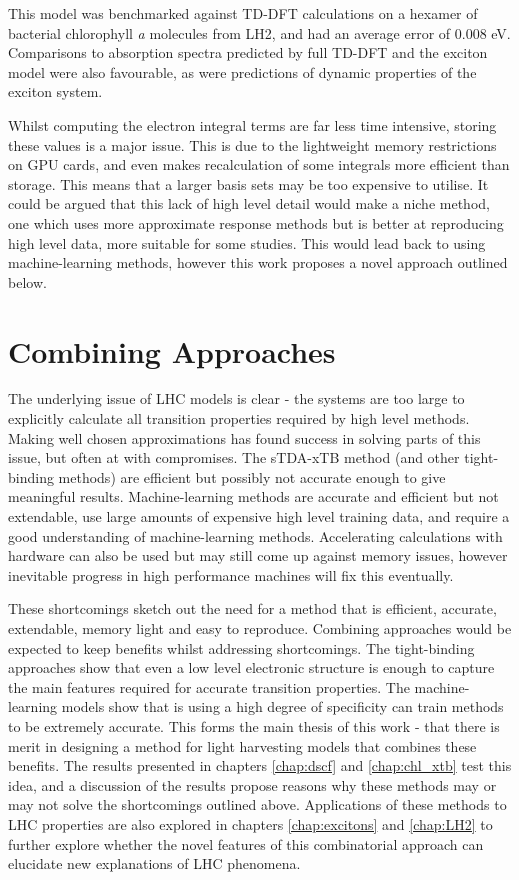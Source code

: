 This model was benchmarked against TD-DFT calculations on a hexamer of bacterial
chlorophyll \emph{a} molecules from LH2, and had an average error of 0.008 eV. Comparisons
to absorption spectra predicted by full TD-DFT and the exciton model were also favourable, 
as were predictions of dynamic properties of the exciton system.

Whilst computing the electron integral terms are far less time intensive, storing
these values is a major issue. This is due to the lightweight memory restrictions
on GPU cards, and even makes recalculation of some integrals more efficient than
storage. This means that a larger basis sets may be too expensive to utilise. It
could be argued that this lack of high level detail would make a niche method, one
which uses more approximate response methods but is better at reproducing high level
data, more suitable for some studies. This would lead back to using machine-learning
methods, however this work proposes a novel approach outlined below.

\section{Combining Approaches}
\label{sec:possible_novel_methods}

The underlying issue of LHC models is clear - the systems are too large to explicitly
calculate all transition properties required by high level methods. Making well 
chosen approximations has found success in solving parts of this issue, but often
at with compromises. The sTDA-xTB method (and other tight-binding methods) are efficient
but possibly not accurate enough to give meaningful results. Machine-learning methods
are accurate and efficient but not extendable, use large amounts of expensive high
level training data, and require a good understanding of machine-learning methods.
Accelerating calculations with hardware can also be used but may still come up against
memory issues, however inevitable progress in high performance machines will fix 
this eventually.

These shortcomings sketch out the need for a method that is efficient, accurate,
extendable, memory light and easy to reproduce. Combining approaches would be expected
to keep benefits whilst addressing shortcomings. The tight-binding approaches show
that even a low level electronic structure is enough to capture the main features
required for accurate transition properties. The machine-learning models show that
is using a high degree of specificity can train methods to be extremely accurate.
This forms the main thesis of this work - that there is merit in designing a method
for light harvesting models that combines these benefits. The results presented in 
chapters \ref{chap:dscf} and \ref{chap:chl_xtb} test this idea, and a discussion
of the results propose reasons why these methods may or may not solve the shortcomings
outlined above. Applications of these methods to LHC properties are also explored
in chapters \ref{chap:excitons} and \ref{chap:LH2} to further explore whether the
novel features of this combinatorial approach can elucidate new explanations of
LHC phenomena.